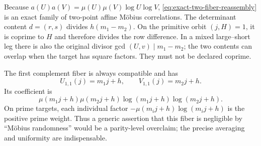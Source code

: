 Because \(a(U)a(V)=\mu(U)\mu(V)\log U\log V\),
\eqref{eq:exact-two-fiber-reassembly} is an exact family of two-point
affine M\"obius correlations.  The determinant content \(d=(r,s)\)
divides \(h(m_1-m_2)\).  On the primitive orbit \((j,H)=1\), it is
coprime to \(H\) and therefore divides the row difference.  In a mixed
large--short leg there is also
the original divisor gcd \((U,v)\mid m_1-m_2\); the two contents can
overlap when the target has square factors.  They must not be declared
coprime.

\begin{remark}[The \(r=s=1\) parity core]
\label{rem:unit-complement}
The first complement fiber is always compatible and has
\begin{equation}
 U_{1,1}(j)=m_1j+h,\qquad
 V_{1,1}(j)=m_2j+h.
 \label{eq:unit-complement-forms}
\end{equation}
Its coefficient is
\begin{equation}
 \mu(m_1j+h)\mu(m_2j+h)
 \log(m_1j+h)\log(m_2j+h).
 \label{eq:unit-parity-coefficient}
\end{equation}
On prime targets, each individual factor
\(-\mu(m_i j+h)\log(m_i j+h)\) is the positive prime weight.  Thus a
generic assertion that this fiber is negligible by ``M\"obius
randomness'' would be a parity-level overclaim; the precise averaging
and uniformity are indispensable.
\end{remark}
